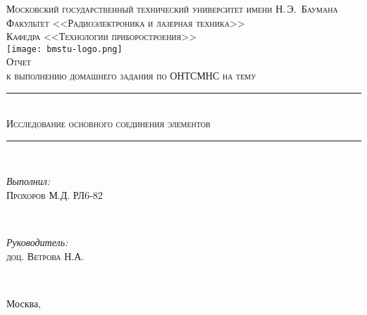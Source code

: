 \newcommand{\HRule}{\rule{\linewidth}{.5mm}\\}

\begin{center}

\textsc{\large Московский государственный технический университет имени Н.\,Э.~Баумана}\\[5mm]
\textsc{Факультет <<Радиоэлектроника и лазерная техника>>}\\
\textsc{Кафедра <<Технологии приборостроения>>}\\[2.5mm]

\texttt{[image: bmstu-logo.png]}\\[0.5cm]

\textsc{\large Отчет}\\
\textsc{к выполнению домашнего задания по ОНТСМНС на тему}

\HRule[0.5cm]
{\huge \textsc{Исследование основного соединения элементов}}
\HRule[2cm]

        \begin{minipage}{0.4\textwidth}
            \begin{flushleft} \large
                \emph{Выполнил:}\\
                \textsc{Прохоров} М.Д. РЛ6-82
            \end{flushleft}
        \end{minipage}
        ~
        \begin{minipage}{0.4\textwidth}
            \begin{flushright} \large
                \emph{Руководитель:} \\
                \textsc{доц. Ветрова} Н.А.
            \end{flushright}
        \end{minipage}\\[1cm]

\vfill


{\large Москва, \the\year}

\end{center}

\newpage
{}